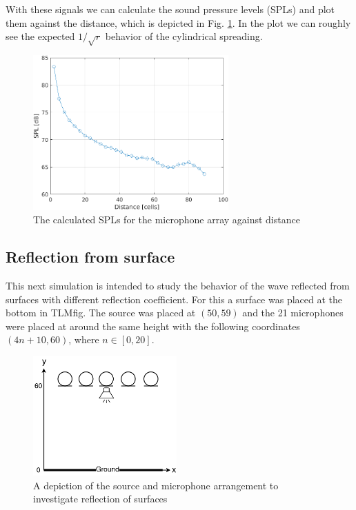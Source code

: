 \documentclass[twocolumn]{article}
\begin{document}
With these signals we can calculate the sound pressure levels (SPLs) and plot
them against the distance, which is depicted in Fig. \ref{fig_3_1_spl}.
In the plot we can roughly see the expected $1/\sqrt{r}$ behavior of the
cylindrical spreading.

\begin{figure}[H]
    \centering
    \includegraphics[width=75mm]{./Images/3_1_spls.png}
    \caption{The calculated SPLs for the microphone array against distance}
    \label{fig_3_1_spl}
\end{figure}

\subsection{Reflection from surface}
This next simulation is intended to study the behavior of the wave reflected from
surfaces with different reflection coefficient.
For this a surface was placed at the bottom in TLMfig.
The source was placed at $\left(50,59\right)$ and the 21 microphones were
placed at around the same height with the following coordinates
$\left(4n+10,60\right)$, where $n\in\left[0,20\right]$.

\begin{figure}[H]
    \centering
    \includegraphics[width=55mm]{./Images/tlmfig_3_2.png}
    \caption{A depiction of the source and microphone arrangement to investigate reflection of surfaces}
    \label{fig_3_2_example}
\end{figure}
\end{document}
